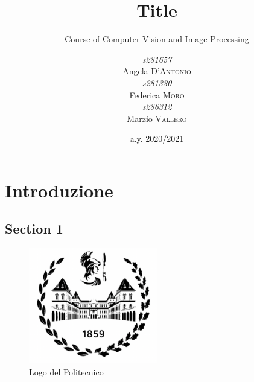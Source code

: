 \documentclass[a4paper, 12pt]{report}
\institute{Polytechnic of Turin}
\title{Title}
\subtitle{Course of Computer Vision and Image Processing}
\author{\textit{s281657}\\Angela \textsc{D'Antonio}\\
        \textit{s281330}\\Federica \textsc{Moro}\\
        \textit{s286312}\\Marzio \textsc{Vallero}}
\date{a.y. 2020/2021}
\begin{document}
\maketitle
\romantableofcontents

\chapter{Introduzione}
\section{Section 1}





\begin{figure}[h]
    \centering
    \includegraphics[width=0.5\textwidth]{resources/image/logo.png} \caption{Logo del Politecnico} \label{fig:logo}
\end{figure}
\end{document}
